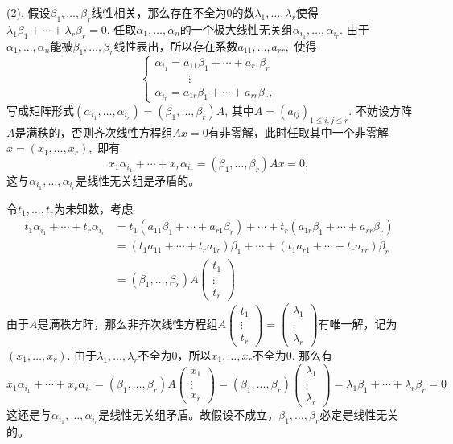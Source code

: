 (2). 假设$\beta_1, \ldots, \beta_r$线性相关，那么存在不全为0的数$\lambda_1, \ldots, \lambda_r$使得$\lambda_1\beta_1 + \cdots + \lambda_r\beta_r = 0.$ 任取$\alpha_1, \ldots, \alpha_n$的一个极大线性无关组$\alpha_{i_1}, \ldots, \alpha_{i_r}$. 由于$\alpha_1, \ldots, \alpha_n$能被$\beta_1, \ldots, \beta_r$线性表出，所以存在系数$a_{11}, \ldots, a_{rr},$ 使得
$$
\begin{cases}
\alpha_{i_1} = a_{11}\beta_1 + \cdots + a_{r1}\beta_r \\
\hspace{3em} \vdots \\
\alpha_{i_r} = a_{1r}\beta_1 + \cdots + a_{rr}\beta_r,
\end{cases}
$$
写成矩阵形式$(\alpha_{i_1}, \ldots, \alpha_{i_r}) = (\beta_1, \ldots, \beta_r) A$, 其中$A = (a_{ij})_{1\leqslant i,j \leqslant r}.$ 不妨设方阵$A$是满秩的，否则齐次线性方程组$Ax = 0$有非零解，此时任取其中一个非零解$x = (x_1, \ldots, x_r),$ 即有
$$x_1\alpha_{i_1} + \cdots + x_r\alpha_{i_r} = (\beta_1, \ldots, \beta_r) Ax = 0,$$
这与$\alpha_{i_1}, \ldots, \alpha_{i_r}$是线性无关组是矛盾的。

令$t_1, \ldots, t_r$为未知数，考虑
\begin{align*}
t_1 \alpha_{i_1} + \cdots + t_r \alpha_{i_r} & = t_1 (a_{11}\beta_1 + \cdots + a_{r1}\beta_r) + \cdots + t_r (a_{1r}\beta_1 + \cdots + a_{rr}\beta_r) \\
& = (t_1 a_{11} + \cdots + t_r a_{1r}) \beta_1 + \cdots + (t_1 a_{r1} + \cdots + t_r a_{rr}) \beta_r \\
& = (\beta_1, \ldots, \beta_r) A \begin{pmatrix} t_1 \\ \vdots \\ t_r \end{pmatrix}
\end{align*}
由于$A$是满秩方阵，那么非齐次线性方程组$A \begin{pmatrix} t_1 \\ \vdots \\ t_r \end{pmatrix} = \begin{pmatrix} \lambda_1 \\ \vdots \\ \lambda_r \end{pmatrix}$有唯一解，记为$(x_1, \ldots, x_r).$ 由于$\lambda_1, \ldots, \lambda_r$不全为0，所以$x_1, \ldots, x_r$不全为0. 那么有
$$x_1 \alpha_{i_1} + \cdots + x_r \alpha_{i_r} = (\beta_1, \ldots, \beta_r) A \begin{pmatrix} x_1 \\ \vdots \\ x_r \end{pmatrix} = (\beta_1, \ldots, \beta_r) \begin{pmatrix} \lambda_1 \\ \vdots \\ \lambda_r \end{pmatrix} = \lambda_1\beta_1 + \cdots + \lambda_r\beta_r = 0$$
这还是与$\alpha_{i_1}, \ldots, \alpha_{i_r}$是线性无关组矛盾。故假设不成立，$\beta_1, \ldots, \beta_r$必定是线性无关的。

